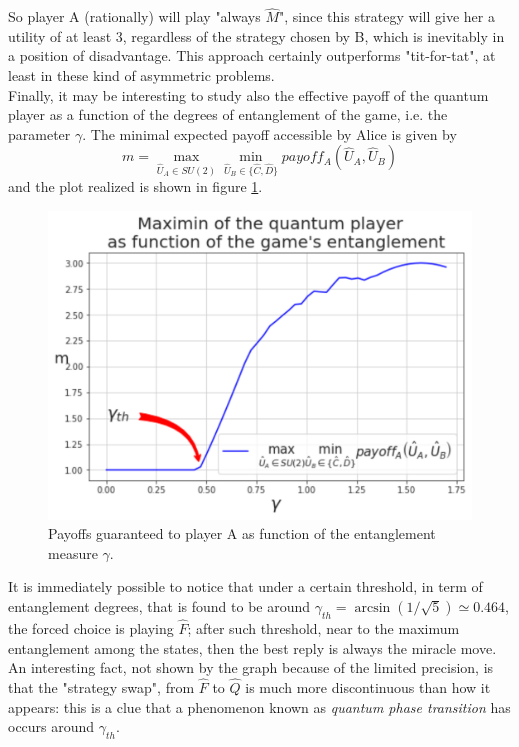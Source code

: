 So player A (rationally) will play "always $\hat{M}$", since this strategy will give her a utility of at least 3, regardless of the strategy chosen by B, which is inevitably in a position of disadvantage. This approach certainly outperforms "tit-for-tat", at least in these kind of asymmetric problems.\\
Finally, it may be interesting to study also the effective payoff of the quantum player as a function of the degrees of entanglement of the game, i.e. the parameter $\gamma$. The minimal expected payoff accessible by Alice is given by
\[ m = \max_{\hat{U}_A\in SU(2)}\min_{\hat{U}_B\in\{\hat{C},\hat{D}\}} payoff_A\left(\hat{U}_A, \hat{U}_B\right) \]
and the plot realized is shown in figure \ref{fig:payoffs_entanglement_PD}. 

\begin{figure}[!ht]
	\centering
	\includegraphics[scale=0.45]{pictures/PD_payoffsentanglement.pdf}
	\caption{Payoffs guaranteed to player A as function of the entanglement measure $\gamma$.}
	\label{fig:payoffs_entanglement_PD}
\end{figure}


It is immediately possible to notice that under a certain threshold, in term of entanglement degrees, that is found to be around $\gamma_{th} = \arcsin\left(1/\sqrt{5}\right)\simeq 0.464$, the forced choice is playing $\hat{F}$; after such threshold, near to the maximum entanglement among the states, then the best reply is always the miracle move. An interesting fact, not shown by the graph because of the limited precision, is that the "strategy swap", from $\hat{F}$ to $\hat{Q}$ is much more discontinuous than how it appears: this is a clue that a phenomenon known as \textit{quantum phase transition} has occurs around $\gamma_{th}$.	

